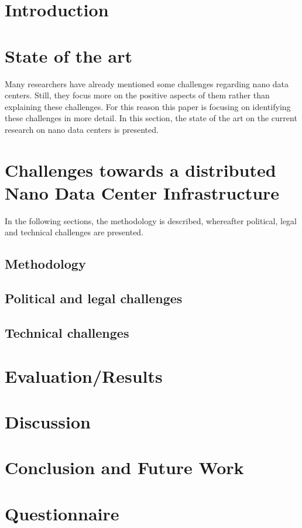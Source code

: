 
\section{Introduction}


\section{State of the art}
\label{StateOfTheArt}
Many researchers have already mentioned some challenges regarding nano data centers. Still, they focus more on the positive aspects of them rather than explaining these challenges. For this reason this paper is focusing on identifying these challenges in more detail. In this section, the state of the art on the current research on nano data centers is presented. 




\section{Challenges towards a distributed Nano Data Center Infrastructure}
\label{sec:challenges}
In the following sections, the methodology is described, whereafter political, legal and technical challenges are presented.

\subsection{Methodology}



\subsection{Political and legal challenges}


\subsection{Technical challenges}


\section{Evaluation/Results}


\section{Discussion}



\section{Conclusion and Future Work}






\appendix
\section{Questionnaire}


